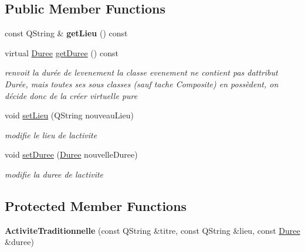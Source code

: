 \subsection*{Public Member Functions}
\begin{DoxyCompactItemize}
\item 
\hypertarget{class_activite_traditionnelle_a8083abcc107dc0a9144176e0ba2ba47c}{}const Q\+String \& {\bfseries get\+Lieu} () const \label{class_activite_traditionnelle_a8083abcc107dc0a9144176e0ba2ba47c}

\item 
\hypertarget{class_activite_traditionnelle_a685b1c01b046576e86a5fe04288176e5}{}virtual \hyperlink{class_duree}{Duree} \hyperlink{class_activite_traditionnelle_a685b1c01b046576e86a5fe04288176e5}{get\+Duree} () const \label{class_activite_traditionnelle_a685b1c01b046576e86a5fe04288176e5}

\begin{DoxyCompactList}\small\item\em renvoit la durée de l\textquotesingle{}evenement la classe evenement ne contient pas d\textquotesingle{}attribut Durée, mais toutes ses sous classes (sauf tache Composite) en possèdent, on décide donc de la créer virtuelle pure \end{DoxyCompactList}\item 
void \hyperlink{class_activite_traditionnelle_a2fb5b53e93f9d191388da7448041553d}{set\+Lieu} (Q\+String nouveau\+Lieu)
\begin{DoxyCompactList}\small\item\em modifie le lieu de l\textquotesingle{}activite \end{DoxyCompactList}\item 
void \hyperlink{class_activite_traditionnelle_ae02975177e5e78ede34eb650d36a73c3}{set\+Duree} (\hyperlink{class_duree}{Duree} nouvelle\+Duree)
\begin{DoxyCompactList}\small\item\em modifie la duree de l\textquotesingle{}activite \end{DoxyCompactList}\end{DoxyCompactItemize}
\subsection*{Protected Member Functions}
\begin{DoxyCompactItemize}
\item 
\hypertarget{class_activite_traditionnelle_a7ef6bdda7b72d06394910f99a00e0ff4}{}{\bfseries Activite\+Traditionnelle} (const Q\+String \&titre, const Q\+String \&lieu, const \hyperlink{class_duree}{Duree} \&duree)\label{class_activite_traditionnelle_a7ef6bdda7b72d06394910f99a00e0ff4}

\end{DoxyCompactItemize}
